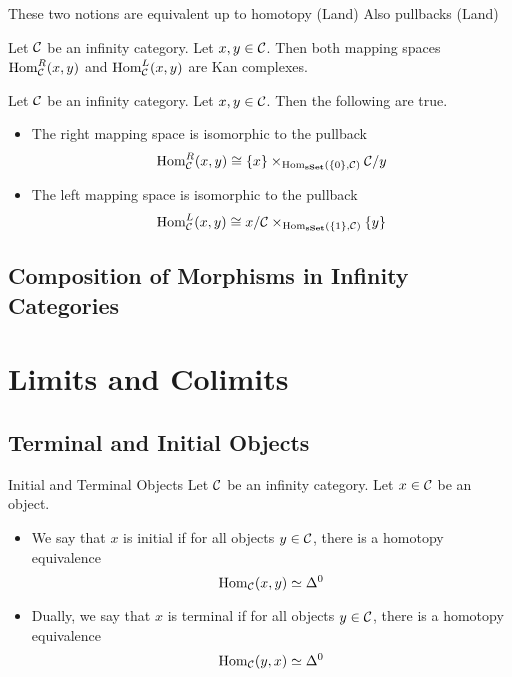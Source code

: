 \documentclass[a4paper]{article}
\begin{document}
These two notions are equivalent up to homotopy (Land) Also pullbacks (Land)

\begin{prp}{}{} Let $\mathcal{C}$ be an infinity category. Let $x,y\in\mathcal{C}$. Then both mapping spaces $\operatorname{Hom}_{\mathcal{C}}^R(x,y)$ and $\operatorname{Hom}_{\mathcal{C}}^L(x,y)$ are Kan complexes. 
\end{prp}

\begin{prp}{}{} Let $\mathcal{C}$ be an infinity category. Let $x,y\in\mathcal{C}$. Then the following are true. 
\begin{itemize}
\item The right mapping space is isomorphic to the pullback $$\operatorname{Hom}_{\mathcal{C}}^R(x,y)\cong\{x\}\times_{\operatorname{Hom}_\bold{sSet}(\{0\},\mathcal{C})}\mathcal{C}/y$$
\item The left mapping space is isomorphic to the pullback $$\operatorname{Hom}_{\mathcal{C}}^L(x,y)\cong x/\mathcal{C}\times_{\operatorname{Hom}_\bold{sSet}(\{1\},\mathcal{C})}\{y\}$$
\end{itemize}
\end{prp}

\subsection{Composition of Morphisms in Infinity Categories}

\pagebreak
\section{Limits and Colimits}
\subsection{Terminal and Initial Objects}
\begin{defn}{Initial and Terminal Objects}{} Let $\mathcal{C}$ be an infinity category. Let $x\in\mathcal{C}$ be an object. 
\begin{itemize}
\item We say that $x$ is initial if for all objects $y\in\mathcal{C}$, there is a homotopy equivalence $$\operatorname{Hom}_{\mathcal{C}}(x,y)\simeq\Delta^0$$
\item Dually, we say that $x$ is terminal if for all objects $y\in\mathcal{C}$, there is a homotopy equivalence $$\operatorname{Hom}_{\mathcal{C}}(y,x)\simeq\Delta^0$$
\end{itemize}
\end{defn}
\end{document}
